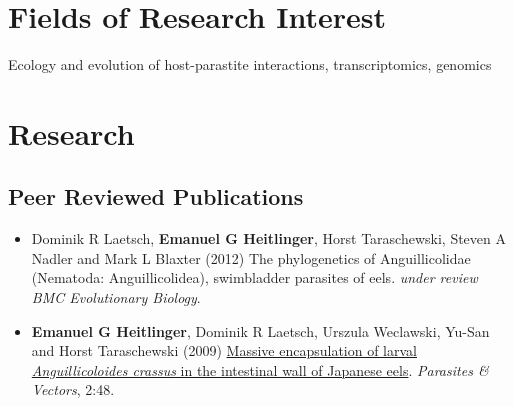 %

\section*{Fields of Research Interest}

Ecology and evolution of host-parastite interactions, transcriptomics, genomics

\section*{Research}

\subsection*{Peer Reviewed Publications}

\begin{itemize}
\item Dominik R Laetsch, \textbf{Emanuel G Heitlinger}, Horst
  Taraschewski, Steven A Nadler and Mark L Blaxter (2012) The
  phylogenetics of Anguillicolidae (Nematoda: Anguillicolidea),
  swimbladder parasites of eels. \textit{under review} \textit{BMC
    Evolutionary Biology}.
\item \textbf{Emanuel G Heitlinger}, Dominik R Laetsch, Urszula Weclawski,
  Yu-San and Horst Taraschewski (2009)
  \href{http://www.parasitesandvectors.com/content/2/1/48}{Massive
    encapsulation of larval \textit{Anguillicoloides crassus} in the
    intestinal wall of Japanese eels}. \textit{Parasites \& Vectors},
  2:48.
\end{itemize}

%


